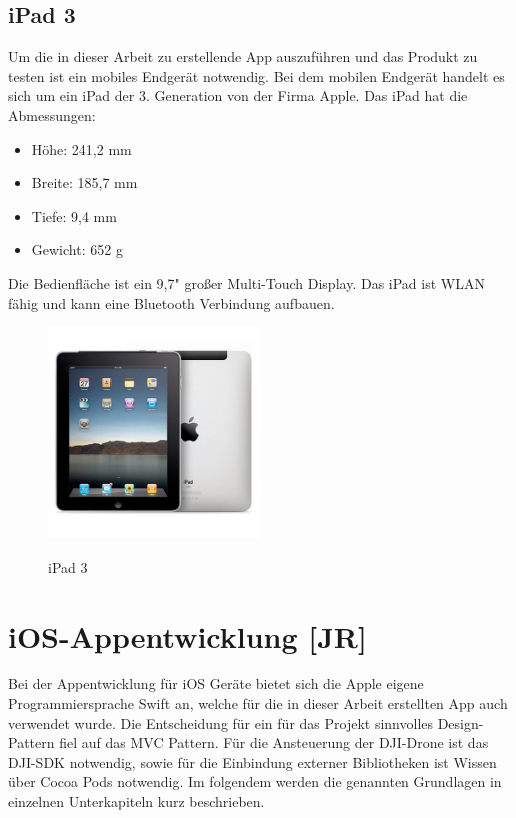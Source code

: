 \subsection{iPad 3}
Um die in dieser Arbeit zu erstellende App auszuführen und das Produkt zu testen ist ein mobiles Endgerät notwendig. 
\newline
Bei dem mobilen Endgerät handelt es sich um ein iPad der 3. Generation von der Firma Apple.
\newline 
Das iPad hat die Abmessungen:
\begin{itemize}
	\item Höhe: 241,2 mm
	\item Breite: 185,7 mm
	\item Tiefe: 9,4 mm
	\item Gewicht: 652 g
\end{itemize}
Die Bedienfläche ist ein 9,7" großer Multi-Touch Display. Das iPad ist \acl{WLAN} fähig und kann eine Bluetooth Verbindung aufbauen. \cite{iPad.Daten}
\begin{figure}[H]
	\begin{center}
		{\includegraphics[width=0.5\textwidth]{images/iPad3.jpg}}
		\caption{iPad 3 \cite{iPad.Bild}}
	\end{center}
\end{figure}



\section{iOS-Appentwicklung [JR]}\label{sec:ioS-Appentwicklung}
Bei der Appentwicklung für iOS Geräte bietet sich die Apple eigene Programmiersprache Swift an, welche für die in dieser Arbeit erstellten App auch verwendet wurde. 
\newline
Die Entscheidung für ein für das Projekt sinnvolles Design-Pattern fiel auf das \acf{MVC} Pattern.
\newline
Für die Ansteuerung der DJI-Drone ist das DJI-SDK notwendig, sowie für die Einbindung externer Bibliotheken ist Wissen über Cocoa Pods notwendig.
\newline
Im folgendem werden die genannten Grundlagen in einzelnen Unterkapiteln kurz beschrieben.

